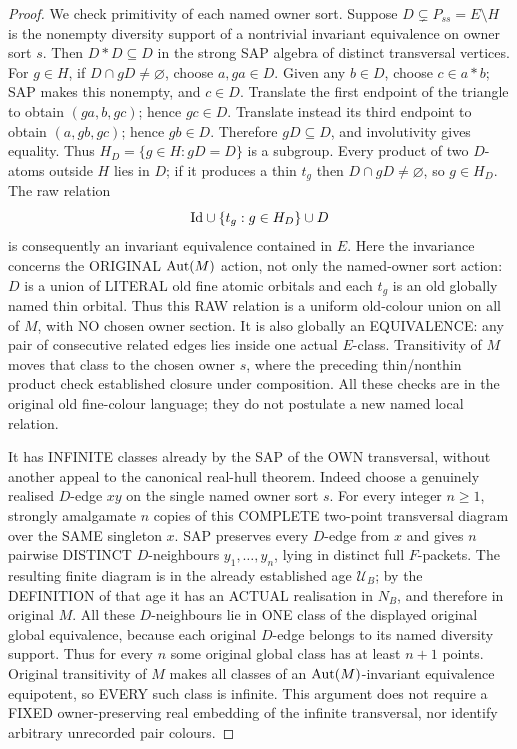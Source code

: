 \begin{proof}
We check primitivity of each named owner sort.  Suppose
$D\subsetneq P_{ss}=E\setminus H$ is the nonempty
diversity support of a nontrivial invariant equivalence
on owner sort $s$.  Then $D*D\subseteq D$ in the strong
SAP algebra of distinct transversal vertices.
For $g\in H$, if $D\cap gD\ne\varnothing$, choose
$a,ga\in D$.  Given any $b\in D$, choose
$c\in a*b$; SAP makes this nonempty, and $c\in D$.
Translate the first endpoint of the triangle to obtain
$(ga,b,gc)$; hence $gc\in D$.  Translate instead its
third endpoint to obtain $(a,gb,gc)$; hence $gb\in D$.
Therefore $gD\subseteq D$, and involutivity gives equality.
Thus $H_D=\{g\in H:gD=D\}$ is a subgroup.
Every product of two $D$-atoms outside $H$ lies in $D$;
if it produces a thin $t_g$ then $D\cap gD\ne\varnothing$,
so $g\in H_D$.  The raw relation
\[
               \mathrm{Id}\cup\{t_g:g\in H_D\}\cup D
\]
is consequently an invariant equivalence contained in $E$.
Here the invariance concerns the ORIGINAL
\(\operatorname{Aut}(M)\) action, not only the named-owner
sort action: \(D\) is a union of LITERAL old
fine atomic orbitals and each \(t_g\) is an old
globally named thin orbital. Thus this RAW
relation is a uniform old-colour union on all
of \(M\), with NO chosen owner section.
It is also globally an EQUIVALENCE:
any pair of consecutive related edges
lies inside one actual \(E\)-class.
Transitivity of \(M\) moves that class
to the chosen owner \(s\), where the
preceding thin/nonthin product check
established closure under composition.
All these checks are in the original
old fine-colour language; they do not
postulate a new named local relation.

It has INFINITE classes already by
the SAP of the OWN transversal,
without another appeal to the
canonical real-hull theorem.
Indeed choose a genuinely realised
\(D\)-edge \(xy\) on the single named
owner sort \(s\). For every
integer \(n\ge1\), strongly
amalgamate \(n\) copies of this
COMPLETE two-point transversal
diagram over the SAME singleton
\(x\). SAP preserves every
\(D\)-edge from \(x\) and gives
\(n\) pairwise DISTINCT
\(D\)-neighbours \(y_1,\ldots,y_n\),
lying in distinct full \(F\)-packets.
The resulting finite diagram
is in the already established
age \(\mathcal U_B\); by the
DEFINITION of that age it has
an ACTUAL realisation in \(N_B\),
and therefore in original \(M\).
All these \(D\)-neighbours lie
in ONE class of the displayed
original global equivalence,
because each original \(D\)-edge
belongs to its named diversity
support. Thus for every \(n\)
some original global class has
at least \(n+1\) points.
Original transitivity of \(M\)
makes all classes of an
\(\operatorname{Aut}(M)\)-invariant equivalence
equipotent, so EVERY such class
is infinite. This argument
does not require a FIXED
owner-preserving real embedding
of the infinite transversal,
nor identify arbitrary
unrecorded pair colours.


\end{proof}
